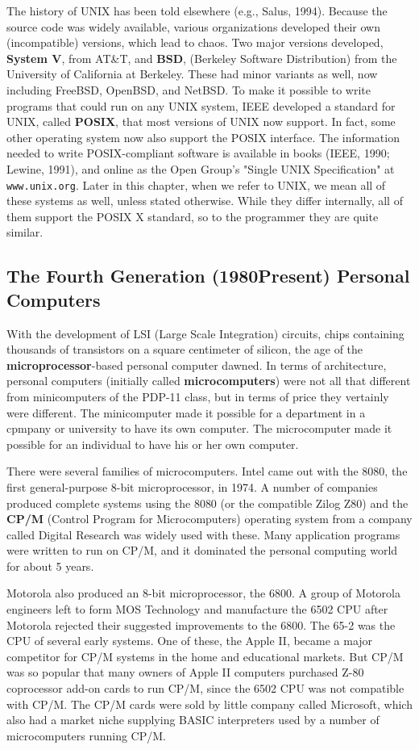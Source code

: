 \documentclass{book}
\newcommand {\kw}  [1] {\textbf{#1}}
\newcommand {\www} [1] {\texttt{#1}}
\begin{document}
The history of UNIX has been told elsewhere (e.g., Salus, 1994).
Because the source code was widely available, various organizations developed their own (incompatible) versions, which lead to chaos.
Two major versions developed, \kw{System V}, from AT\&T, and \kw{BSD}, (Berkeley Software Distribution) from the University of California at Berkeley.
These had minor variants as well, now including FreeBSD, OpenBSD, and NetBSD.
To make it possible to write programs that could run on any UNIX system, IEEE developed a standard for UNIX, called \kw{POSIX},
that most versions of UNIX now support.
In fact, some other operating system now also support the POSIX interface.
The information needed to write POSIX-compliant software is available in books (IEEE, 1990; Lewine, 1991),
and online as the Open Group's "Single UNIX Specification" at \www{www.unix.org}.
Later in this chapter, when we refer to UNIX, we mean all of these systems as well, unless stated otherwise.
While they differ internally, all of them support the POSIX X standard, so to the programmer they are quite similar.

\subsection{The Fourth Generation (1980Present) Personal Computers}
With the development of LSI (Large Scale Integration) circuits, chips containing thousands of transistors on a square centimeter of silicon,
the age of the \kw{microprocessor}-based personal computer dawned.
In terms of architecture, personal computers (initially called \kw{microcomputers}) were not all that different from minicomputers of the PDP-11 class, 
but in terms of price they vertainly were different.
The minicomputer made it possible for a department in a cpmpany or university to have its own computer.
The microcomputer made it possible for an individual to have his or her own computer.

There were several families of microcomputers.
Intel came out with the 8080, the first general-purpose 8-bit microprocessor, in 1974.
A number of companies produced complete systems using the 8080 (or the compatible Zilog Z80) 
and the \kw{CP/M} (Control Program for Microcomputers) operating system from a company called Digital Research was widely used with these.
Many application programs were written to run on CP/M, and it dominated the personal computing world for about 5 years.

Motorola also produced an 8-bit microprocessor, the 6800.
A group of Motorola engineers left to form MOS Technology and manufacture the 6502 CPU after Motorola rejected their suggested improvements to the 6800.
The 65-2 was the CPU of several early systems.
One of these, the Apple II, became a major competitor for CP/M systems in the home and educational markets.
But CP/M was so popular that many owners of Apple II computers purchased Z-80 coprocessor add-on cards to run CP/M, 
since the 6502 CPU was not compatible with CP/M.
The CP/M cards were sold by little company called Microsoft, which also had a market niche supplying BASIC interpreters 
used by a number of microcomputers running CP/M.
\end{document}
